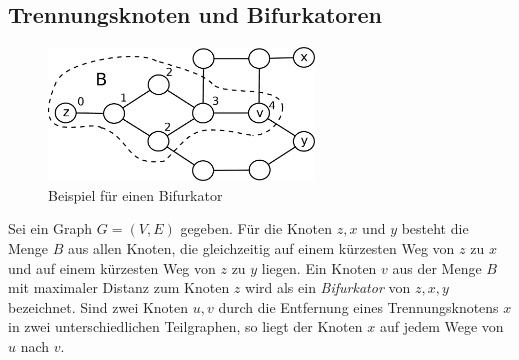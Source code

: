 \subsection{Trennungsknoten und Bifurkatoren}
\begin{figure}[ht]
\centering
\includegraphics*[width = 200pt]{bilder/bifurkator.pdf}
\caption{Beispiel für einen Bifurkator}
\label{bild:bifurkator}
\end{figure}  	 
Sei ein Graph $G=(V,E)$ gegeben. Für die Knoten $z,x$ und $y$ besteht die Menge $B$ aus allen Knoten, die gleichzeitig auf einem kürzesten Weg von $z$ zu $x$ und auf einem kürzesten Weg von $z$ zu $y$ liegen. Ein Knoten $v$ aus der Menge $B$ mit maximaler Distanz zum Knoten $z$ wird als ein \emph{Bifurkator} von $z, x, y$ bezeichnet.\newline
Sind zwei Knoten $u,v$ durch die Entfernung eines Trennungsknotens $x$ in zwei unterschiedlichen Teilgraphen, so liegt der Knoten $x$ auf jedem Wege von $u$ nach $v$.
\newpage
